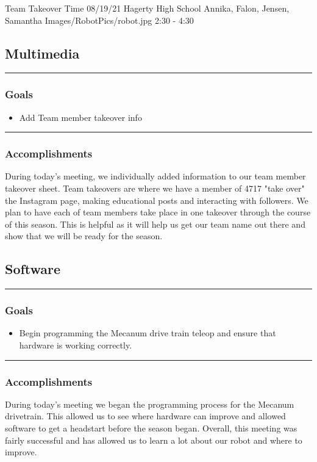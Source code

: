 \insertmeeting 
	{Team Takeover Time} 
	{08/19/21}
	{Hagerty High School}
	{Annika, Falon, Jensen, Samantha}
	{Images/RobotPics/robot.jpg}
	{2:30 - 4:30}
	
\subsection*{Multimedia}
\noindent\hfil\rule{\textwidth}{.4pt}\hfil
\subsubsection*{Goals}
\begin{itemize}
    \item Add Team member takeover info  

\end{itemize} 

\noindent\hfil\rule{\textwidth}{.4pt}\hfil

\subsubsection*{Accomplishments}
During today's meeting, we individually added information to our team member takeover sheet. Team takeovers are where we have a member of 4717 "take over" the Instagram page, making educational posts and interacting with followers. We plan to have each of team members take place in one takeover through the course of this season. This is helpful as it will help us get our team name out there and show that we will be ready for the season.

\subsection*{Software}
\noindent\hfil\rule{\textwidth}{.4pt}\hfil
\subsubsection*{Goals}
\begin{itemize}
    \item Begin programming the Mecanum drive train teleop and ensure that hardware is working correctly.

\end{itemize} 

\noindent\hfil\rule{\textwidth}{.4pt}\hfil

\subsubsection*{Accomplishments}
During today's meeting we began the programming process for the Mecanum drivetrain. This allowed us to see where hardware can improve and allowed software to get a headstart before the season began. Overall, this meeting was fairly successful and has allowed us to learn a lot about our robot and where to improve.
